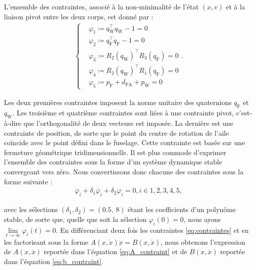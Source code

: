 L'ensemble des contraintes, associé à la non-minimalité de l'état $(x,v)$ et à la liaison pivot entre les deux corps, est donné par :
\begin{align}
    \label{eq:contraintes}
    \left\{
    \begin{aligned}
    &\varphi_{1} \coloneqq q_{\text{W}}^\top q_{\text{W}} - 1 = 0\\
    &\varphi_{2} \coloneqq q_{\text{F}}^\top q_{\text{F}} - 1 = 0\\
    &\varphi_{3} \coloneqq R_{2}(q_{\text{W}})^\top R_{3}(q_{\text{F}}) = 0\\
    &\varphi_{4} \coloneqq R_{2}(q_{\text{W}})^\top R_{1}(q_{\text{F}}) = 0\\
    &\varphi_{5} \coloneqq p_{\text{F}} + d_{\text{FA}} + p_{\text{W}} = 0
    \end{aligned}.
    \right.
\end{align}

Les deux premières contraintes imposent la norme unitaire des quaternions $q_{\text{F}}$ et $q_{\text{W}}$.
Les troisième et quatrième contraintes sont liées à une contrainte pivot, c'est-à-dire que l'orthogonalité de deux vecteurs est imposée. La dernière est une contrainte de position, de sorte que le point du centre de rotation de l'aile coïncide avec le point défini dans le fuselage. Cette contrainte est basée sur une fermeture géométrique tridimensionnelle.
Il est plus commode d'exprimer l'ensemble des contraintes sous la forme d'un système dynamique stable convergeant vers zéro. Nous convertissons donc chacune des contraintes sous la forme suivante :
\begin{align}
    \ddot{\varphi_{i}} + \delta_{1} \dot{\varphi_{i}}  + \delta_{2} \varphi_{i} = 0, i \in {1,2,3,4,5},
\end{align}

avec les sélections $(\delta_{1}, \delta_{2}) = (0.5,~8)$ étant les coefficients d'un polynôme stable, de sorte que, quelle que soit la sélection $\varphi_{i}(0) = 0$, nous ayons $\lim\limits_{t \to \infty} \varphi_{i}(t) = 0$. En différenciant deux fois les contraintes \eqref{eq:contraintes} et en les factorisant sous la forme $ A(x,\dot{x}) \ddot{x} = B(x,\dot{x})$, nous obtenons l'expression de $A(x,\dot{x})$ reportée dans l'équation \eqref{eq:A_contraint} et de $B(x,\dot{x})$ reportée dans l'équation \eqref{eq:b_contraint}.

